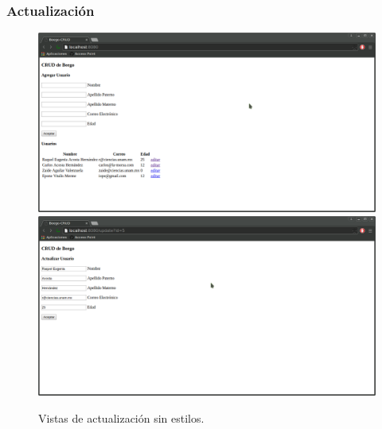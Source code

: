 \documentclass[12pt]{article}
\begin{document}
\subsubsection{Actualización}\label{sec:edit}
\begin{figure}[H]
  \includegraphics[width=1\textwidth]{edit1}
  \includegraphics[width=1\textwidth]{edit2}
  \caption{Vistas de actualización sin estilos.}
\end{figure}
\end{document}
